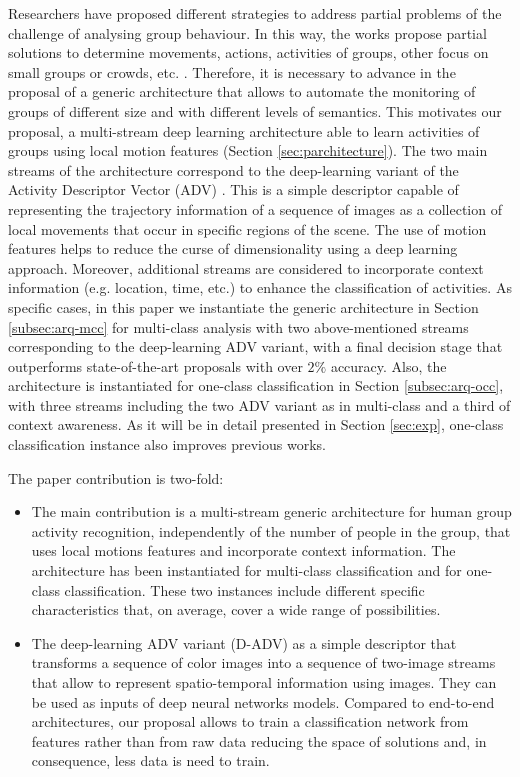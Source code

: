 Researchers have proposed different strategies to address partial problems of the challenge of analysing group behaviour. In this way, the works propose partial solutions to determine movements, actions, activities of groups, other focus on small groups or crowds, etc. \cite{borja2018short}. Therefore, it is necessary to advance in the proposal of a generic architecture that allows to automate the monitoring of groups of different size and with different levels of semantics.  This motivates our proposal, a multi-stream deep learning architecture able to learn activities of groups using local motion features (Section \ref{sec:parchitecture}). The two main streams of the architecture correspond to the deep-learning variant of the Activity Descriptor Vector (ADV) \cite{Azorin-Lopez2014}. This is a simple descriptor capable of representing the trajectory information of a sequence of images as a collection of local movements that occur in specific regions of the scene. The use of motion features helps to reduce the curse of dimensionality using a deep learning approach. Moreover, 
additional streams are considered to incorporate context information (e.g. location, time, etc.) to enhance the classification of activities. As specific cases, in this paper we instantiate the generic architecture in Section \ref{subsec:arq-mcc} for multi-class analysis with two above-mentioned streams corresponding to the deep-learning ADV variant, with a final decision stage that outperforms state-of-the-art proposals with over $2\%$ accuracy. Also, the architecture is instantiated for one-class classification in Section \ref{subsec:arq-occ}, with three streams including the two ADV variant as in multi-class and a third of context awareness. As it will be in detail presented in Section \ref{sec:exp}, one-class classification instance also improves previous works.

The paper contribution is two-fold:

\begin{itemize}
    \item The main contribution is a multi-stream generic architecture for human group activity recognition, independently of the number of people in the group, that uses local motions features and incorporate context information.  The architecture has been instantiated for multi-class classification and for one-class classification. These two instances include different specific characteristics that, on average, cover a wide range of possibilities.
    
    \item The deep-learning ADV variant (D-ADV) as a simple descriptor that transforms a sequence of color images into a sequence of two-image streams that allow to represent spatio-temporal information using images. They can be used as inputs of deep neural networks models. Compared to end-to-end architectures, our proposal allows to train a classification network from features rather than from raw data reducing the space of solutions and, in consequence, less data is need to train.
\end{itemize}
